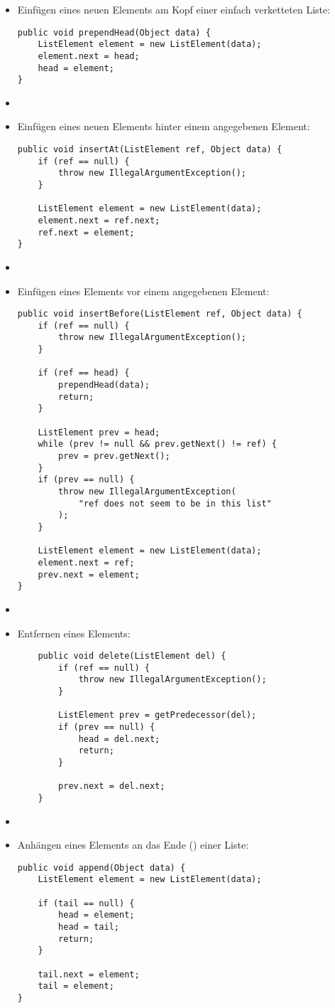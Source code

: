 \begin{itemize}
    \item Einfügen eines neuen Elements am Kopf einer einfach verketteten Liste:
\begin{verbatim}
public void prependHead(Object data) {
    ListElement element = new ListElement(data);
    element.next = head;
    head = element;
}
\end{verbatim}
    \item[]
    \item Einfügen eines neuen Elements hinter einem angegebenen Element:
\begin{verbatim}
public void insertAt(ListElement ref, Object data) {
    if (ref == null) {
        throw new IllegalArgumentException();
    }

    ListElement element = new ListElement(data);
    element.next = ref.next;
    ref.next = element;
}
\end{verbatim}
    \item[]
    \item Einfügen eines Elements vor einem angegebenen Element:
\begin{verbatim}
public void insertBefore(ListElement ref, Object data) {
    if (ref == null) {
        throw new IllegalArgumentException();
    }

    if (ref == head) {
        prependHead(data);
        return;
    }

    ListElement prev = head;
    while (prev != null && prev.getNext() != ref) {
        prev = prev.getNext();
    }
    if (prev == null) {
        throw new IllegalArgumentException(
            "ref does not seem to be in this list"
        );
    }

    ListElement element = new ListElement(data);
    element.next = ref;
    prev.next = element;
}
\end{verbatim}
    \item[]
    \item Entfernen eines Elements:
    \begin{verbatim}
    public void delete(ListElement del) {
        if (ref == null) {
            throw new IllegalArgumentException();
        }

        ListElement prev = getPredecessor(del);
        if (prev == null) {
            head = del.next;
            return;
        }

        prev.next = del.next;
    }
    \end{verbatim}
    \item[]
    \item Anhängen eines Elements an das Ende () einer Liste:
\begin{verbatim}
public void append(Object data) {
    ListElement element = new ListElement(data);

    if (tail == null) {
        head = element;
        head = tail;
        return;
    }

    tail.next = element;
    tail = element;
}
\end{verbatim}
\end{itemize}